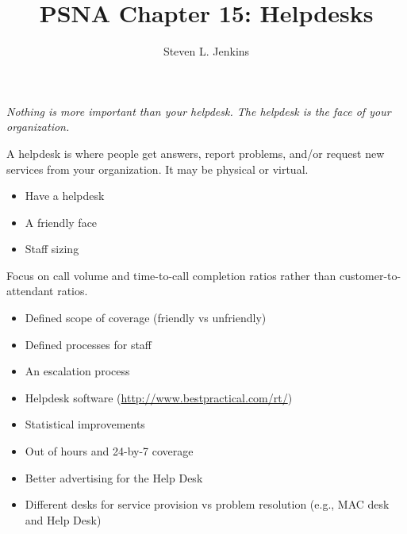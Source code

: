 \documentclass{slides}
\title{PSNA Chapter 15: Helpdesks}
\author{Steven L. Jenkins}
\newcommand{\bi}{\begin{itemize}}
\newcommand{\ei}{\end{itemize}}
\begin{document}

\emph{Nothing is more important than your helpdesk.  The helpdesk
is the face of your organization.}

A helpdesk is where people get answers, report problems, and/or
request new services from your organization.  It may be physical
or virtual.


\bi
\item Have a helpdesk
\item A friendly face
\item Staff sizing
\ei

Focus on call volume and time-to-call completion ratios rather than
customer-to-attendant ratios.


\bi
\item Defined scope of coverage (friendly vs unfriendly)
\item Defined processes for staff
\item An escalation process
\item Helpdesk software (\url{http://www.bestpractical.com/rt/})
\ei


\bi
\item Statistical improvements
\item Out of hours and 24-by-7 coverage
\item Better advertising for the Help Desk
\item Different desks for service provision vs problem resolution
  (e.g., MAC desk and Help Desk)
\ei
\end{document}
